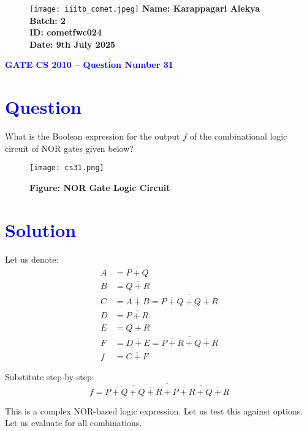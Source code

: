 \documentclass[twocolumn]{article}
\begin{document}
\begin{figure}[t]
    \texttt{[image: iiitb\_comet.jpeg]} %
    \textbf{Name: Karappagari Alekya} \\
    \textbf{Batch: 2} \\
    \textbf{ID: cometfwc024} \\
    \textbf{Date: 9th July 2025}
\end{figure}

\begin{center}
    {\LARGE \textbf{\textcolor{blue}{GATE CS 2010 – Question Number 31}}}
\end{center}

\vspace{1em}
\section*{\textcolor{blue}{Question}}
What is the Boolean expression for the output $f$ of the combinational logic circuit of NOR gates given below?

\begin{figure}[h]
    \centering
    \texttt{[image: cs31.png]}
    \caption*{\textbf{Figure: NOR Gate Logic Circuit}}
\end{figure}

\section*{\textcolor{blue}{Solution}}

Let us denote:
\begin{align*}
A &= \overline{P + Q} \\
B &= \overline{Q + R} \\
C &= \overline{A + B} = \overline{ \overline{P + Q} + \overline{Q + R} } \\
D &= \overline{P + R} \\
E &= \overline{Q + R} \\
F &= \overline{D + E} = \overline{ \overline{P + R} + \overline{Q + R} } \\
f &= \overline{C + F}
\end{align*}

Substitute step-by-step:
\[
f = \overline{
\overline{ \overline{P + Q} + \overline{Q + R} } + 
\overline{ \overline{P + R} + \overline{Q + R} }
}
\]

This is a complex NOR-based logic expression. Let us test this against options. Let us evaluate for all combinations.
\end{document}

